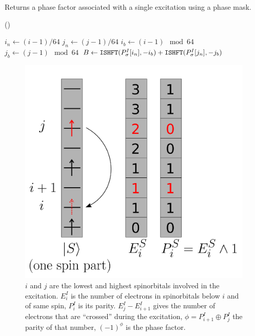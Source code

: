 \documentclass[./thesis.tex]{subfiles}
\begin{document}
\begin{algorithm}
	\caption{Returns a phase factor associated with a single excitation using a phase mask.}
	\label{alg:PHASE_FROM_PHASEMASK}	
	
	\Fn(){}{

		$i_n \gets (i-1)/64$ \;
		$j_n \gets (j-1)/64$ \;
		$i_b \gets (i-1) \mod 64$ \;
		$j_b \gets (j-1) \mod 64$ \;
		$B \gets \text{\texttt{ISHFT}}(P_\sigma^I[i_n],-i_b) + \text{\texttt{ISHFT}}(P_\sigma^I[j_n],-j_b)$ \;
        
        
		}
\end{algorithm}


                
\begin{figure}[h!]
	\begin{center}
		\includegraphics[width=0.5\columnwidth]{figures/determinant_driven/phase}
		\caption[phase mask illustration]{
		$i$ and $j$ are the lowest and highest spinorbitals involved in the excitation. $E_i^I$ is the number of electrons in spinorbitals below $i$ and of same spin, $P_i^I$ is its parity. $E_j^I - E_{i+1}^I$ gives the number of electrons that are ``crossed'' during the excitation, $\phi = P^I_{i+1} \oplus P^I_j$ the parity of that number, $(-1)^\phi$ is the phase factor.
		}
		\label{generators_selectors}
	\end{center}
\end{figure}
\end{document}
